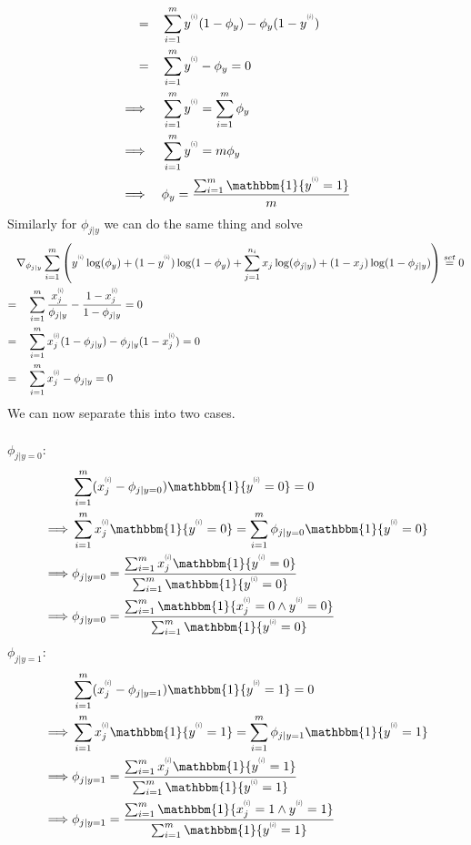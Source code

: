 \documentclass{article}
\newcommand{\supi}[1]{\scalebox{0.6}[0.75]{$^{(#1)}$}}
\begin{document}
\begin{enumerate}[label=(\alph*)]
\begin{align*}
       =&{}\quad\sum_{i=1}^my^{\supi{i}}(1-\phi_y) - \phi_y(1-y^{\supi{i}})\\
       =&{}\quad\sum_{i=1}^my^{\supi{i}} - \phi_y = 0\\
       \implies&{}\quad\sum_{i=1}^my^{\supi{i}} = \sum_{i=1}^m\phi_y\\
       \implies&{}\quad\sum_{i=1}^my^{\supi{i}} = m\phi_y\\
       \implies&{}\quad\phi_y = \frac{\sum_{i=1}^m\mathbbm{1}\{y^{\supi{i}} = 1\}}{m}
    \end{align*}
    Similarly for $\phi_{j|y}$ we can do the same thing and solve
    \begin{align*}
       &{}\nabla_{\phi_{j|y}} \sum_{i=1}^m\left(y^{\supi{i}}\log(\phi_y) + (1-y^{\supi{i}})\log(1-\phi_y) + \sum_{j=1}^{n_i}x_j\log (\phi_{j|y})+(1-x_j)\log(1-\phi_{j|y})\right) \overset{set}= 0\\
       =&{}\quad \sum_{i=1}^m\frac{x_j^{\supi{i}}}{\phi_{j|y}} - \frac{1-x_j^{\supi{i}}}{1-\phi_{j|y}} = 0\\
       =&{}\quad \sum_{i=1}^m x_j^{\supi{i}}(1-\phi_{j|y}) - \phi_{j|y}(1-x_j^{\supi{i}}) = 0\\
       =&{}\quad \sum_{i=1}^m x_j^{\supi{i}} - \phi_{j|y} = 0
    \end{align*}
    We can now separate this into two cases.\\\\
    $\phi_{j|y=0}$:
    \begin{align*}
        &{}\sum_{i=1}^m (x_j^{\supi{i}} - \phi_{j|y=0})\mathbbm{1}\{y^{\supi{i}} = 0\} = 0\\
        \implies&{}\sum_{i=1}^m x_j^{\supi{i}}\mathbbm{1}\{y^{\supi{i}} = 0\} = \sum_{i=1}^m \phi_{j|y=0}\mathbbm{1}\{y^{\supi{i}} = 0\}\\
        \implies&{}\phi_{j|y=0} =  \frac{\sum_{i=1}^m x_j^{\supi{i}}\mathbbm{1}\{y^{\supi{i}} = 0\}}{ \sum_{i=1}^m\mathbbm{1}\{y^{\supi{i}} = 0\}}\\
        \implies&{}\phi_{j|y=0} =  \frac{\sum_{i=1}^m\mathbbm{1}\{x_j^{\supi{i}} = 0 \wedge y^{\supi{i}} = 0\}}{ \sum_{i=1}^m\mathbbm{1}\{y^{\supi{i}} = 0\}}
    \end{align*}
    $\phi_{j|y=1}$:
    \begin{align*}
        &{}\sum_{i=1}^m (x_j^{\supi{i}} - \phi_{j|y=1})\mathbbm{1}\{y^{\supi{i}} = 1\} = 0\\
        \implies&{}\sum_{i=1}^m x_j^{\supi{i}}\mathbbm{1}\{y^{\supi{i}} = 1\} = \sum_{i=1}^m \phi_{j|y=1}\mathbbm{1}\{y^{\supi{i}} = 1\}\\
        \implies&{}\phi_{j|y=1} =  \frac{\sum_{i=1}^m x_j^{\supi{i}}\mathbbm{1}\{y^{\supi{i}} = 1\}}{ \sum_{i=1}^m\mathbbm{1}\{y^{\supi{i}} = 1\}}\\
        \implies&{}\phi_{j|y=1} =  \frac{\sum_{i=1}^m\mathbbm{1}\{x_j^{\supi{i}} = 1 \wedge y^{\supi{i}} = 1\}}{ \sum_{i=1}^m\mathbbm{1}\{y^{\supi{i}} = 1\}}
    \end{align*}
    

\end{enumerate}
\end{document}
